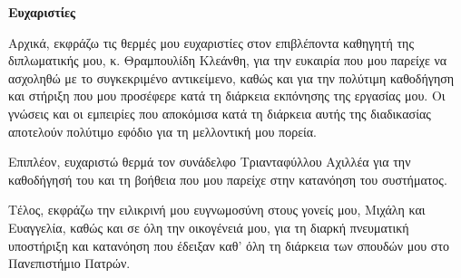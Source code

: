 \begin{center}
  {\LARGE \textbf{Ευχαριστίες}}\\[1cm]
\end{center}

Αρχικά, εκφράζω τις θερμές μου ευχαριστίες στον επιβλέποντα καθηγητή της διπλωματικής μου, κ. Θραμπουλίδη Κλεάνθη, για την ευκαιρία που μου παρείχε να ασχοληθώ με το συγκεκριμένο αντικείμενο, καθώς και για την πολύτιμη καθοδήγηση και στήριξη που μου προσέφερε κατά τη διάρκεια εκπόνησης της εργασίας μου. Οι γνώσεις και οι εμπειρίες που αποκόμισα κατά τη διάρκεια αυτής της διαδικασίας αποτελούν πολύτιμο εφόδιο για τη μελλοντική μου πορεία.

\vspace{5mm}
Επιπλέον, ευχαριστώ θερμά τον συνάδελφο Τριανταφύλλου Αχιλλέα για την καθοδήγησή του και τη βοήθεια που μου παρείχε στην κατανόηση του συστήματος.

\vspace{5mm}
Τέλος, εκφράζω την ειλικρινή μου ευγνωμοσύνη στους γονείς μου, Μιχάλη και Ευαγγελία, καθώς και σε όλη την οικογένειά μου, για τη διαρκή πνευματική υποστήριξη και κατανόηση που έδειξαν καθ' όλη τη διάρκεια των σπουδών μου στο Πανεπιστήμιο Πατρών.
